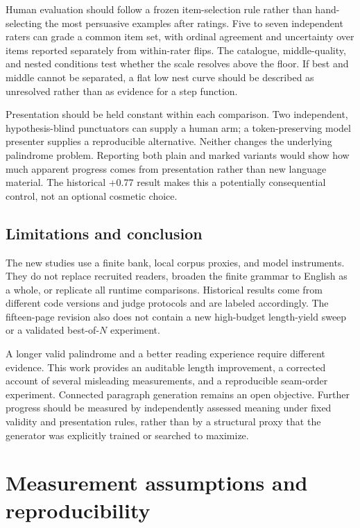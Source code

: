 \documentclass[11pt,letterpaper]{article}
\newcommand{\pageend}{\clearpage}
\begin{document}
Human evaluation should follow a frozen item-selection rule rather than hand-selecting the most persuasive examples after ratings. Five to seven independent raters can grade a common item set, with ordinal agreement and uncertainty over items reported separately from within-rater flips. The catalogue, middle-quality, and nested conditions test whether the scale resolves above the floor. If best and middle cannot be separated, a flat low nest curve should be described as unresolved rather than as evidence for a step function.

Presentation should be held constant within each comparison. Two independent, hypothesis-blind punctuators can supply a human arm; a token-preserving model presenter supplies a reproducible alternative. Neither changes the underlying palindrome problem. Reporting both plain and marked variants would show how much apparent progress comes from presentation rather than new language material. The historical +0.77 result makes this a potentially consequential control, not an optional cosmetic choice.

\subsection*{Limitations and conclusion}
The new studies use a finite bank, local corpus proxies, and model instruments. They do not replace recruited readers, broaden the finite grammar to English as a whole, or replicate all runtime comparisons. Historical results come from different code versions and judge protocols and are labeled accordingly. The fifteen-page revision also does not contain a new high-budget length-yield sweep or a validated best-of-$N$ experiment.

A longer valid palindrome and a better reading experience require different evidence. This work provides an auditable length improvement, a corrected account of several misleading measurements, and a reproducible seam-order experiment. Connected paragraph generation remains an open objective. Further progress should be measured by independently assessed meaning under fixed validity and presentation rules, rather than by a structural proxy that the generator was explicitly trained or searched to maximize.
\pageend

\appendix
\section{Measurement assumptions and reproducibility}
\label{app:methods}
\end{document}
